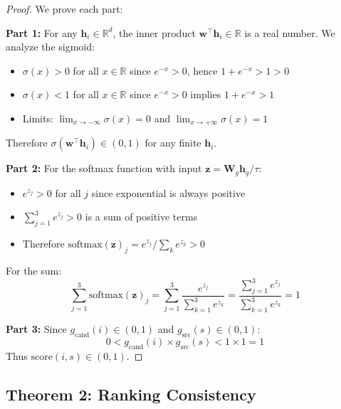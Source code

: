 \documentclass[11pt]{article}
\begin{document}
\begin{proof}
We prove each part:

\textbf{Part 1:} For any $\mathbf{h}_i \in \mathbb{R}^d$, the inner product $\mathbf{w}^\top \mathbf{h}_i \in \mathbb{R}$ is a real number. We analyze the sigmoid:

\begin{itemize}
    \item $\sigma(x) > 0$ for all $x \in \mathbb{R}$ since $e^{-x} > 0$, hence $1 + e^{-x} > 1 > 0$
    \item $\sigma(x) < 1$ for all $x \in \mathbb{R}$ since $e^{-x} > 0$ implies $1 + e^{-x} > 1$
    \item Limits: $\lim_{x \to -\infty} \sigma(x) = 0$ and $\lim_{x \to +\infty} \sigma(x) = 1$
\end{itemize}

Therefore $\sigma(\mathbf{w}^\top \mathbf{h}_i) \in (0, 1)$ for any finite $\mathbf{h}_i$.

\textbf{Part 2:} For the softmax function with input $\mathbf{z} = \mathbf{W}_g \mathbf{h}_q / \tau$:

\begin{itemize}
    \item $e^{z_j} > 0$ for all $j$ since exponential is always positive
    \item $\sum_{j=1}^3 e^{z_j} > 0$ is a sum of positive terms
    \item Therefore $\text{softmax}(\mathbf{z})_j = e^{z_j} / \sum_{k} e^{z_k} > 0$
\end{itemize}

For the sum:
\begin{equation}
\sum_{j=1}^3 \text{softmax}(\mathbf{z})_j = \sum_{j=1}^3 \frac{e^{z_j}}{\sum_{k=1}^3 e^{z_k}} = \frac{\sum_{j=1}^3 e^{z_j}}{\sum_{k=1}^3 e^{z_k}} = 1
\end{equation}

\textbf{Part 3:} Since $g_{\text{cand}}(i) \in (0, 1)$ and $g_{\text{src}}(s) \in (0, 1)$:
\begin{equation}
0 < g_{\text{cand}}(i) \times g_{\text{src}}(s) < 1 \times 1 = 1
\end{equation}
Thus $\text{score}(i, s) \in (0, 1)$.
\end{proof}

\subsection{Theorem 2: Ranking Consistency}
\end{document}
